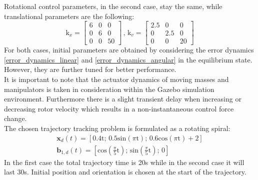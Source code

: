 \noindent Rotational control parameters, in the second case, stay the same, while translational parameters are the following: 
\begin{equation*}
	\text{k}_x = 
	\begin{bmatrix}
		6 &  0  &  0 \\
		0 & 6  &	0 \\ 
		0 &  0  & 50 	
	\end{bmatrix}
	\, , \,	
	\text{k}_v =
	\begin{bmatrix}
		2.5 & 0 & 0 \\
		0 & 2.5 & 0 \\
		0 & 0 & 20
	\end{bmatrix}
\end{equation*}
For both cases, initial parameters are obtained by considering the error dynamics \ref{error_dynamics_linear} and \ref{error_dynamics_angular} in the equilibrium state. However, they are further tuned for better performance.\\
It is important to note that the actuator dynamics of moving masses and manipulators is taken in consideration within the Gazebo simulation environment. Furthermore there is a slight transient delay when increasing or decreasing rotor velocity which results in a non-instantaneous control force change. \\
\indent The chosen trajectory tracking problem is formulated as a rotating spiral:
\begin{gather*}
	\textbf{x}_d(t) = [0.4\text{t}; \, 0.5\text{sin}(\pi\text{t}); \, 0.6\text{cos}(\pi\text{t}) + 2] \\
	\textbf{b}_{1,d}(t) = [\text{cos}\left(\frac{\pi}{5}\text{t}\right); \, \text{sin}\left(\frac{\pi}{5}\text{t}\right); \, 0]
\end{gather*}
\noindent In the first case the total trajectory time is 20s while in the second case it will last 30s. Initial position and orientation is chosen at the start of the trajectory. \\
